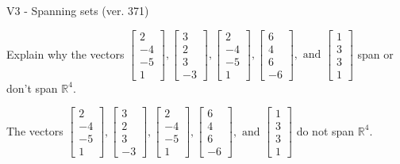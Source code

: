 \begin{exercise}
  \begin{exerciseTitle}V3 - Spanning sets (ver. 371)\end{exerciseTitle}
  \begin{exerciseStatement}
    Explain why the vectors \(\left[\begin{array}{r}
2 \\
-4 \\
-5 \\
1
\end{array}\right] , \left[\begin{array}{r}
3 \\
2 \\
3 \\
-3
\end{array}\right] , \left[\begin{array}{r}
2 \\
-4 \\
-5 \\
1
\end{array}\right] , \left[\begin{array}{r}
6 \\
4 \\
6 \\
-6
\end{array}\right] , \text{ and } \left[\begin{array}{r}
1 \\
3 \\
3 \\
1
\end{array}\right]\) span or don't span \(\mathbb{R}^4\). 
	


  \end{exerciseStatement}
  \begin{exerciseAnswer}
   The vectors \(\left[\begin{array}{r}
2 \\
-4 \\
-5 \\
1
\end{array}\right] , \left[\begin{array}{r}
3 \\
2 \\
3 \\
-3
\end{array}\right] , \left[\begin{array}{r}
2 \\
-4 \\
-5 \\
1
\end{array}\right] , \left[\begin{array}{r}
6 \\
4 \\
6 \\
-6
\end{array}\right] , \text{ and } \left[\begin{array}{r}
1 \\
3 \\
3 \\
1
\end{array}\right]\) 
  	 do not  
	span \(\mathbb{R}^4\).
  



\end{exerciseAnswer}
\end{exercise}
